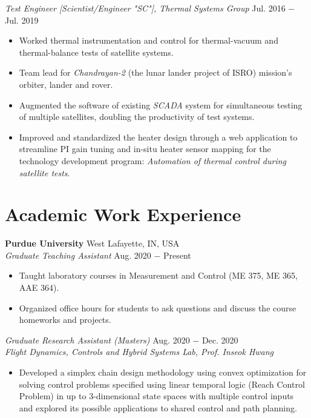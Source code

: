 \documentclass[letterpaper,10pt]{article}
\begin{document}
\vspace{3pt}
\textit{Test Engineer [Scientist/Engineer "SC"], Thermal Systems Group} \hfill Jul. 2016 $-$ Jul. 2019
\begin{itemize}[noitemsep,nolistsep,leftmargin=0.25in,label={--}]
    \item Worked thermal instrumentation and control for thermal-vacuum and thermal-balance tests of satellite systems.
	\item Team lead for \textit{Chandrayan-2} (the lunar lander project of ISRO) mission's orbiter, lander and rover.
    \item Augmented the software of existing \textit{SCADA} system for simultaneous testing of multiple satellites, doubling the productivity of test systems.
	\item Improved and standardized the heater design through a web application to streamline PI gain tuning and in-situ heater sensor mapping for the technology development program: \textit{Automation of thermal control during satellite tests}.
\end{itemize}

\section{Academic Work Experience}
\noindent \textbf{Purdue University} \hfill West Lafayette, IN, USA \\
\vspace{3pt}
\noindent \textit{Graduate Teaching Assistant} \hfill Aug. 2020 $-$ Present\\
\begin{itemize}[noitemsep,nolistsep,leftmargin=0.25in,label={--}]
    \item Taught laboratory courses in Measurement and Control (ME 375, ME 365, AAE 364).
    \item Organized office hours for students to ask questions and discuss the course homeworks and projects.
\end{itemize}
\vspace{3pt}
\noindent \textit{Graduate Research Assistant (Masters)} \hfill Aug. 2020 $-$ Dec. 2020\\
\textit{Flight Dynamics, Controls and Hybrid Systems Lab, \hfill Prof. Inseok Hwang}
\begin{itemize}[noitemsep,nolistsep,leftmargin=0.25in,label={--}]
	\item Developed a simplex chain design methodology using convex optimization for solving control problems specified using linear temporal logic (Reach Control Problem) in up to 3-dimensional state spaces with multiple control inputs and explored its possible applications to shared control and path planning.
\end{itemize}
\end{document}
